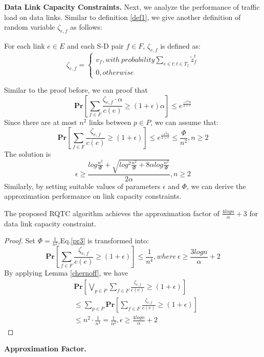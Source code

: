 \textbf{Data Link Capacity Constraints.} Next, we analyze the performance of traffic load on data links. Similar to definition \ref{def1}, we give another definition of random variable $\zeta_{e,f}$ as follows:
\begin{definition}
For each link $e \in E$ and each S-D pair $f \in F$, $\zeta_{e,f}$  is defined as:
\begin{equation}
\zeta_{e,f}=
\begin{cases}
     v_f, with \ probability \sum_{e \in t:t \in T_f}\widetilde{z}_f^t \\
     0, otherwise
\end{cases}
\end{equation}
\end{definition}
Similar to the proof before, we can proof that
\begin{equation}\label{pr3}
  \textbf{Pr}[\sum_{f \in F} \frac{\zeta_{e,f} \cdot \alpha}{c(e)} \ge (1+\epsilon)\alpha] \le e^{\frac{-\epsilon^2\alpha}{2+\epsilon}}
\end{equation}
Since there are at most $n^2$ links between $p \in P$, we can assume that:
\begin{equation}\label{pr3}
  \textbf{Pr}[\sum_{f \in F} \frac{\zeta_{e,f}}{c(e)} \ge (1+\epsilon)] \le e^{\frac{-\epsilon^2\alpha}{2+\epsilon}} \le \frac{\Phi}{n^2},n \ge 2
\end{equation}
The solution is
\begin{equation}\label{solution2}
  \epsilon \ge \frac{log\frac{n^2}{\Phi}+\sqrt{log^2\frac{n^2}{\Phi}+8\alpha log\frac{n^2}{\Phi}}}{2\alpha},n \ge 2
\end{equation}
Similarly, by setting suitable values of parameters $\epsilon$ and $\Phi$, we can derive the approximation performance on link capacity constraints.
\begin{theorem}
  The proposed RQTC algorithm achieves the approximation factor of $\frac{4logn}{\alpha}+3$ for data link capacity constraint.
\end{theorem}
\begin{proof}
Set $\Phi = \frac{1}{n^2}$,Eq.\ref{pr3} is transformed into:
\begin{equation}
    \textbf{Pr}[\sum_{f \in F} \frac{\zeta_{e,f}}{c(e)} \ge (1+\epsilon)] \le \frac{1}{n^4},where \ \epsilon \ge \frac{3logn}{\alpha}+2
\end{equation}
By applying Lemma \ref{chernoff}, we have
\begin{equation}
\begin{aligned}
    &\textbf{Pr}[\bigvee_{p \in P}\sum_{f \in F} \frac{\zeta_{e,f}}{c(e)} \ge (1+\epsilon)]\\ 
    &\le \sum_{p \in P}\textbf{Pr}[\sum_{f \in F} \frac{\zeta_{e,f}}{c(e)} \ge (1+\epsilon)]\\
    &\le n^2 \cdot \frac{1}{n^4} = \frac{1}{n^2}, \epsilon \ge \frac{4logn}{\alpha}+2
\end{aligned}
\end{equation}
\end{proof}
\textbf{Approximation Factor.}



